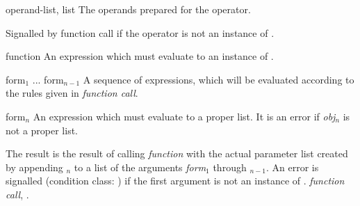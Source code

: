 \begin{optDefinition}
\begin{initoptions}
    \item[operand-list, list] The operands prepared for the operator.
\end{initoptions}
%
\remarks%
Signalled by function call if the operator is not an instance of
.

%
\Syntax
{}%
%
\begin{arguments}
    \item[function] An expression which must evaluate to an instance of
    .

    \item[form$_1$ ... form$_{n-1}$] A sequence of expressions, which will be
    evaluated according to the rules given in {\em function call}.

    \item[form$_n$] An expression which must evaluate to a proper list.  It is
    an error if {\em obj$_n$} is not a proper list.
\end{arguments}
%
\result%
The result is the result of calling {\em function} with the actual parameter
list created by appending $_n$ to a list of the arguments {\em
    form}$_1$ through $_{n-1}$.  An error is signalled (condition
class: ) if the
first argument is not an instance of .
%
\seealso%
{\em function call}, .
\end{optDefinition}

